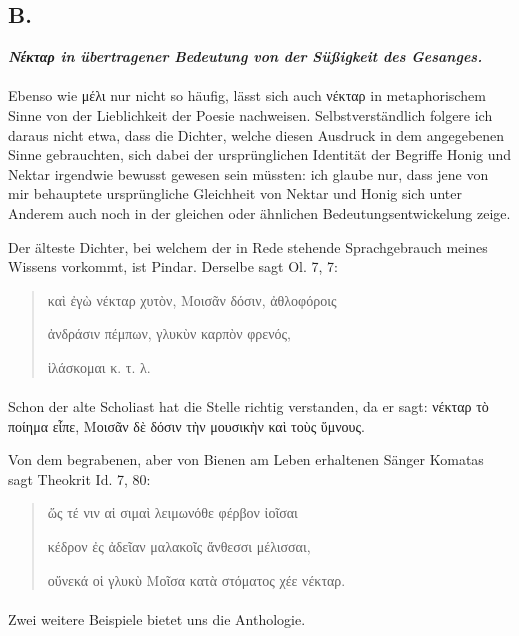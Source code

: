 \documentclass[a4paper, 11pt, oneside]{article}
\begin{document}
\subsection{B.}
\begin{center}
\textbf{\emph{Νέκταρ in übertragener Bedeutung von der Süßigkeit des Gesanges.}}
\end{center}
\paragraph{}
Ebenso wie μέλι nur nicht so häufig, lässt sich auch νέκταρ in metaphorischem Sinne von der Lieblichkeit der Poesie nachweisen. Selbstverständlich folgere ich daraus nicht etwa, dass die Dichter, welche diesen Ausdruck in dem angegebenen Sinne gebrauchten, sich dabei der ursprünglichen Identität der Begriffe Honig und Nektar irgendwie bewusst gewesen sein müssten: ich glaube nur, dass jene von mir behauptete ursprüngliche Gleichheit von Nektar und Honig sich unter Anderem auch noch in der gleichen oder ähnlichen Bedeutungsentwickelung zeige.

Der älteste Dichter, bei welchem der in Rede stehende Sprachgebrauch meines Wissens vorkommt, ist Pindar. Derselbe sagt Ol. 7, 7:
\begin{quotation}\large
καὶ ἐγὼ νέκταρ χυτὸν, Μοισᾶν δόσιν, ἀθλοφόροις

ἀνδράσιν πέμπων, γλυκὺν καρπὸν φρενός,

ἱλάσκομαι κ. τ. λ.
\end{quotation}
\paragraph{}
Schon der alte Scholiast hat die Stelle richtig verstanden, da er sagt: νέκταρ τὸ ποίημα εἶπε, Μοισᾶν δὲ δόσιν τὴν μουσικὴν καὶ τοὺς ὕμνους.

Von dem begrabenen, aber von Bienen am Leben erhaltenen Sänger Komatas sagt Theokrit Id. 7, 80:
\begin{quotation}\large
ὥς τέ νιν αἱ σιμαὶ λειμωνόθε φέρβον ἰοῖσαι

κέδρον ἐς ἀδεῖαν μαλακοῖς ἄνθεσσι μέλισσαι,

οὔνεκά οἱ γλυκὺ Μοῖσα κατὰ στόματος χέε νέκταρ.
\end{quotation}
\paragraph{}
Zwei weitere Beispiele bietet uns die Anthologie.
\end{document}
